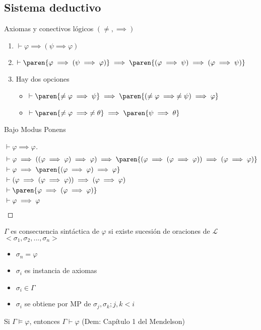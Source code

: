 \subsection{Sistema deductivo}
Axiomas y conectivos lógicos $(\neq,\implies)$
\begin{enumerate}
	\item $\vdash\varphi\implies(\psi\implies\varphi)$
	\item $\vdash\paren{\varphi\implies(\psi\implies\varphi)}\implies\paren{(\varphi\implies\psi)\implies(\varphi\implies\psi)}$
	\item Hay dos opciones\begin{itemize}
		      \item $\vdash\paren{\neq\varphi\implies\psi}\implies\paren{(\neq\varphi\implies\neq\psi)\implies\varphi}$
		      \item $\vdash\paren{\neq\varphi\implies\neq\theta}\implies\paren{\psi\implies\theta}$
	      \end{itemize}
\end{enumerate}
Bajo Modus Ponens
\begin{proof}[$\vdash\varphi\implies\varphi$]
	\begin{align*}
		 & \vdash\varphi\implies((\varphi\implies\varphi)\implies\varphi)\implies\paren{(\varphi\implies(\varphi\implies\varphi))\implies(\varphi\implies\varphi)} \\
		 & \vdash\varphi\implies\paren{(\varphi\implies\varphi)\implies\varphi}                                                                                    \\
		 & \vdash(\varphi\implies(\varphi\implies\varphi))\implies(\varphi\implies\varphi)                                                                         \\
		 & \vdash\paren{\varphi\implies(\varphi\implies\varphi)}                                                                                                   \\
		 & \vdash\varphi\implies\varphi
	\end{align*}
\end{proof}
\begin{defn}
	$\Gamma$ es consecuencia sintáctica de $\varphi$ si existe sucesión de oraciones de $\mathcal{L}$ $<\sigma_1,\sigma_2,...,\sigma_n>$
	\begin{itemize}
		\item $\sigma_n=\varphi$
		\item $\sigma_i$ es instancia de axiomas
		\item $\sigma_i\in\Gamma$
		\item $\sigma_i$ se obtiene por MP de $\sigma_j,\sigma_k;j,k<i$
	\end{itemize}
\end{defn}
\begin{thm}[Completitud]
    Si $\Gamma\models\varphi$, entonces $\Gamma\vdash\varphi$ (Dem: Capítulo 1 del Mendelson)
\end{thm}

